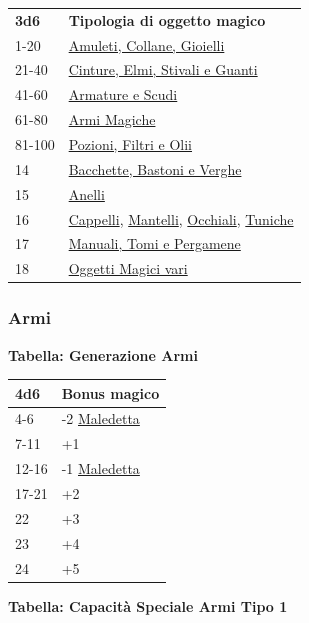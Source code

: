\begin{multicols}{2}
{{\small \begin{tabular}{ll}
\textbf{3d6}& \textbf{Tipologia di oggetto magico}\\
1-20 &\hyperlink{amuleticollanegioielli}{Amuleti, Collane, Gioielli}\\
21-40 &\hyperlink{cintureelmi}{Cinture, Elmi, Stivali e Guanti}\\
41-60 &\hyperlink{armatureescudi}{Armature e Scudi}\\
61-80 &\hyperlink{armimagiche}{Armi Magiche}\\
81-100 &\hyperlink{pozionifiltri}{Pozioni, Filtri e Olii}\\
14&\hyperlink{bastonibacchette}{Bacchette, Bastoni e Verghe}\\
15&\hyperlink{anellimagici}{Anelli}\\
16&\hyperlink{Cappelli}{Cappelli}, \hyperlink{Mantelli}{Mantelli}, \hyperlink{OcchialidaNotte}{Occhiali}, \hyperlink{Tuniche}{Tuniche}\\
17&\hyperlink{manualitomi}{Manuali, Tomi e Pergamene}\\
18&\hyperlink{oggettimagicivari}{Oggetti Magici vari}
\end{tabular}}

\subsubsection{Armi}

\textbf{Tabella: Generazione Armi}\hypertarget{armimagiche}{}\label{armimagiche}

\medskip

{\small\begin{tabularx}{0.45\textwidth}{lX}
\textbf{4d6} & \textbf{Bonus magico}\\
\hline
4-6 & -2 \hyperlink{Arma maledetta}{Maledetta}\\
7-11 &+1\\
12-16 & -1 \hyperlink{Arma maledetta}{Maledetta}\\
17-21 & +2\\
22 & +3\\
23 & +4\\
24 &+5\\
\end{tabularx}}

\textbf{Tabella: Capacità Speciale Armi Tipo 1}\hypertarget{Capacità Speciale Armi Tipo 1}{}

\medskip

}
\end{multicols}
